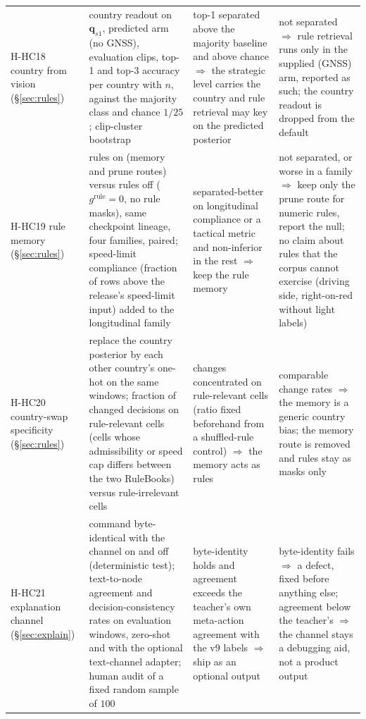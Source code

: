 \begin{longtable}{@{}p{1.3cm}p{3.8cm}p{5.3cm}p{4.9cm}@{}}
H-HC18 country from vision (\S\ref{sec:rules}) & country readout on $\mathbf q_{s1}$, predicted arm (no GNSS), evaluation clips, top-1 and top-3 accuracy per country with $n$, against the majority class and chance $1/25$; clip-cluster bootstrap & top-1 separated above the majority baseline and above chance $\Rightarrow$ the strategic level carries the country and rule retrieval may key on the predicted posterior & not separated $\Rightarrow$ rule retrieval runs only in the supplied (GNSS) arm, reported as such; the country readout is dropped from the default \\
H-HC19 rule memory (\S\ref{sec:rules}) & rules on (memory and prune routes) versus rules off ($g^{\text{rule}}=0$, no rule masks), same checkpoint lineage, four families, paired; speed-limit compliance (fraction of rows above the release's speed-limit input) added to the longitudinal family & separated-better on longitudinal compliance or a tactical metric and non-inferior in the rest $\Rightarrow$ keep the rule memory & not separated, or worse in a family $\Rightarrow$ keep only the prune route for numeric rules, report the null; no claim about rules that the corpus cannot exercise (driving side, right-on-red without light labels) \\
H-HC20 country-swap specificity (\S\ref{sec:rules}) & replace the country posterior by each other country's one-hot on the same windows; fraction of changed decisions on rule-relevant cells (cells whose admissibility or speed cap differs between the two RuleBooks) versus rule-irrelevant cells & changes concentrated on rule-relevant cells (ratio fixed beforehand from a shuffled-rule control) $\Rightarrow$ the memory acts as rules & comparable change rates $\Rightarrow$ the memory is a generic country bias; the memory route is removed and rules stay as masks only \\
H-HC21 explanation channel (\S\ref{sec:explain}) & command byte-identical with the channel on and off (deterministic test); text-to-node agreement and decision-consistency rates on evaluation windows, zero-shot and with the optional text-channel adapter; human audit of a fixed random sample of $100$ & byte-identity holds and agreement exceeds the teacher's own meta-action agreement with the v9 labels $\Rightarrow$ ship as an optional output & byte-identity fails $\Rightarrow$ a defect, fixed before anything else; agreement below the teacher's $\Rightarrow$ the channel stays a debugging aid, not a product output \\
\end{longtable}
\endgroup

